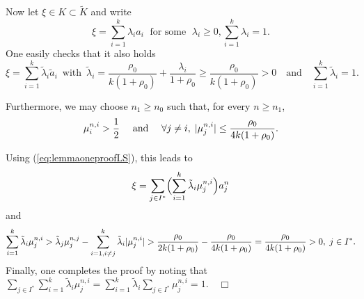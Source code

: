 Now let $\xi\in K\subset \tilde K$ and write
\[
	\xi = \sum_{i=1}^k \lambda_i a_i\;
	\text{ for some }\; \lambda_i \geq 0, \sum_{i=1}^k \lambda_i = 1.
\]
One easily checks that it also holds 
\[
	\xi = \sum_{i=1}^k \tilde \lambda_i \tilde a_i\, \text{ with  } \, \tilde
	\lambda_i = \frac{\rho_0}{k(1+\rho_0)} + \frac{\lambda_i}{ 1+\rho_0} \geq \frac{\rho_0}{k(1+\rho_0)} > 0 \quad  \text{and}\quad \sum_{i=1}^k
	\tilde \lambda_i = 1.
\]

Furthermore, we may choose  $n_1 \geq n_0$ such that, for every $n\geq n_1$,
\[
\mu^{n,i}_i > \frac{1}{2} \quad \text{ and } \quad  \forall j \neq i,\; \lvert\mu^{n,i}_j\rvert \leq
\frac{\rho_0}{4k(1+\rho_0)}.
\]

Using (\ref{eq:lemmaoneproofLS}),  this leads to
\[
 \xi = \sum_{j\in I^\ast} \Bigl(\sum_{i=1}^k \tilde \lambda_i  \mu^{n,i}_j
 \Bigr) a^n_j
\]
and 
\[
	\sum_{i=1}^k \tilde \lambda_i  \mu^{n,i}_j > \tilde \lambda_j  \mu^{n,j}_j -
	\sum_{i=1,i\neq j}^k \tilde \lambda_i  \lvert\mu^{n,i}_j\rvert >
	\frac{\rho_0}{2k(1+\rho_0)} - \frac{\rho_0}{4k(1+\rho_0)} =
	\frac{\rho_0}{4k(1+\rho_0)} > 0, \;j \in I^\ast.
\]
Finally, one completes the proof by noting that 
$\displaystyle 	\sum_{j\in I^\ast} \sum_{i=1}^k \tilde \lambda_i  \mu^{n,i}_j = \sum_{i=1}^k \tilde
	\lambda_i \sum_{j\in I^\ast} \mu^{n,i}_j = 1.  \quad \Box$


